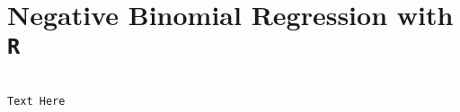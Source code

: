 \documentclass[00-GLMregression.tex]{subfiles}
\begin{document}
	
\section{Negative Binomial Regression with \texttt{R}}

\begin{framed}
\begin{verbatim}

Text Here

\end{verbatim}	
\end{framed}



\end{document}
